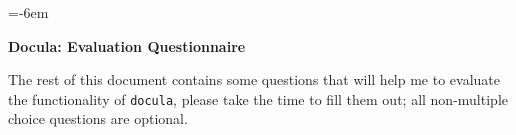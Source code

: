 
\def\LayoutTextField#1#2{\makebox[6em][l]{#1}\raisebox{-.5ex}{#2}}
\def\LayoutChoiceField#1#2{\makebox[6em][l]{#1}#2}
\newdimen\longline
\longline=\textwidth\advance\longline-6em

\makeatletter
{}
\makeatother
\def\DefaultOptionsofRadio{print}

\newcommand{\quest}[3]{
  \medskip
  \begin{minipage}{\linewidth}
    \noindent
    #2
    \medskip
    \begin{adjustwidth}{-2cm}{-2cm}
      \begin{center}
        \ChoiceMenu[radio,name=#1]{}{#3}\\
      \end{center}
      \bigskip
    \end{adjustwidth}
    \end{minipage}
  \bigskip
}

\begin{center}
    \bf Docula: Evaluation Questionnaire
\end{center}
The rest of this document contains some questions that will help me to
evaluate the functionality of \verb|docula|, please take the time to fill them
out; all non-multiple choice questions are optional.

